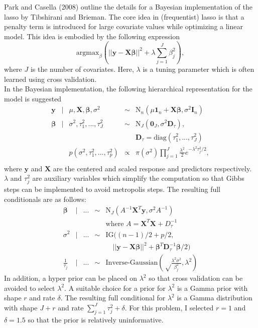 \documentclass{../../tex_template/asaproc}
\newcommand{\p}[1]{\left(#1\right)}
\newcommand{\norm}[1]{ \left|\left|#1\right|\right| }
\newcommand{\y}{\bm y}
\newcommand{\X}{\bm X}
\begin{document}
Park and Casella (2008) outline the details for a Bayesian implementation of
the lasso by Tibshirani and Brieman. The core idea in (frequentist) lasso is
that a penalty term is introduced for large covariate values while optimizing a
linear model. This idea is embodied by the following expression
\[
  \text{argmax}_\beta \p{ \norm{\y - \X\bm\beta}^2 +\lambda\sum_{j=1}^J{\beta_j^2}},
\]
where $J$ is the number of covariates.  Here, $\lambda$ is a tuning parameter
which is often learned using cross validation.\\

In the Bayesian implementation, the following hierarchical representation for the model
is suggested
\[
\begin{array}{rclcl}
  \y &|& \mu,\X,\bm\beta,\sigma^2 &\sim& \text{N}_n(\mu\bm1_n + \X\bm\beta, \sigma^2 \bm I_n) \\
  \bm\beta &|& \sigma^2,\tau^2_1,...,\tau^2_J &\sim& \text{N}_J(\bm 0_J, \sigma^2\bm D_\tau), \\
           &&&& \bm D_\tau  = \text{diag}(\tau^2_1,...,\tau^2_J)\\
           &&p(\sigma^2,\tau^2_1,...,\tau^2_p) &\propto& \pi(\sigma^2) \prod_{j=1}^J 
  \frac{\lambda^2}{2}  e^{-\lambda^2\tau_j^2/2},\\
\end{array}
\]
where $\y$ and $\X$ are the centered and scaled response and predictors
respectively.  $\lambda$ and $\tau_j^2$ are auxiliary variables which simplify
the computation so that Gibbs steps can be implemented to avoid metropolis
steps. The resulting full conditionals are as follows:
\[
\begin{array}{rclcl}
  \bm\beta &|& ... &\sim& \text{N}_J(A^{-1}\X^{T}\y,\sigma^2A^{-1})\\
           &&&& \text{where } A = \X^{T}\X + D_\tau^{-1}\\
  \sigma^2 &|& ... &\sim& \text{IG}((n-1)/2+p/2,\\
           &&&&\quad\norm{\y-\X\bm\beta}^2+\bm\beta^T\bm D^{-1}_\tau\bm\beta/2)\\
  \frac{1}{\tau_j} &|&... &\sim& \text{Inverse-Gaussian}(\sqrt\frac{\lambda^2\sigma^2}{\beta_j^2},\lambda^2)
\end{array}
\]
In addition, a hyper prior can be placed on $\lambda^2$ so that cross
validation can be avoided to select $\lambda^2$. A suitable choice for a prior
for $\lambda^2$ is a Gamma prior with shape $r$ and rate $\delta$. The
resulting full conditional for $\lambda^2$ is a Gamma distribution with shape
$J+r$ and rate $\sum_{j=1}^J\tau_j^2+\delta$. For this problem, I selected
$r=1$ and $\delta=1.5$ so that the prior is relatively uninformative.\\
\end{document}
